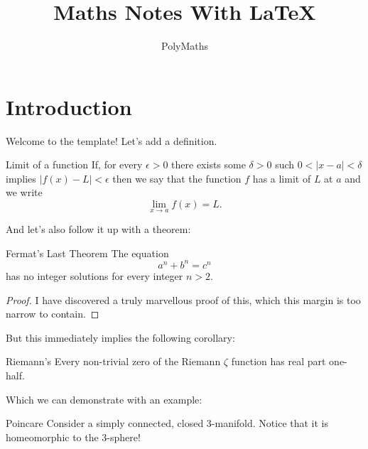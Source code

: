 \documentclass{article}
\title{Maths Notes With \LaTeX}
\author{PolyMaths}
\begin{document}
	\maketitle
	\section{Introduction}
	Welcome to the template! Let's add a definition.
	\begin{definition}{Limit of a function}{}
	If, for every $ \epsilon >0 $ there exists some $ \delta >0 $ such $ 0<|x-a|<\delta $ implies $ |f(x)-L|<\epsilon $ then we say that the function $ f $ has a limit of $ L $ at $ a $ and we write
	\[\lim_{x\to a}f(x)=L.\]
	\end{definition}
	And let's also follow it up with a theorem:
	\begin{theorem}{Fermat's Last Theorem}{}
		The equation
		\[a^n+b^n=c^n\]
		has no integer solutions for every integer $ n> 2 $.
	\end{theorem}
	\begin{proof}
		I have discovered a truly marvellous proof of this, which this margin is too narrow to contain.
	\end{proof}
	But this immediately implies the following corollary:
	\begin{corollary}{Riemann's}{}
		Every non-trivial zero of the Riemann $ \zeta $ function has real part one-half.
	\end{corollary}
	Which we can demonstrate with an example:
	\begin{example}{Poincare}{}
		Consider a simply connected, closed 3-manifold. Notice that it is homeomorphic to the 3-sphere!
	\end{example}
		
\end{document}
